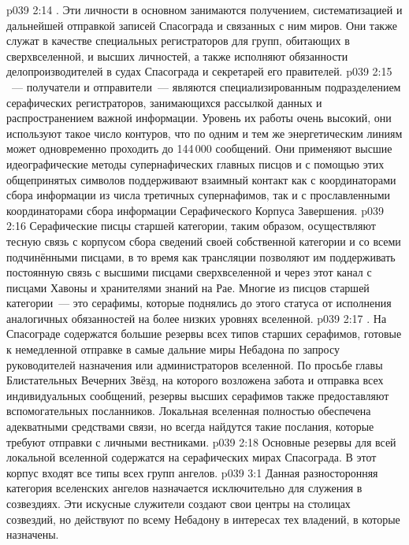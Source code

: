 \vs p039 2:14 . Эти личности в основном занимаются получением, систематизацией и дальнейшей отправкой записей Спасограда и связанных с ним миров. Они также служат в качестве специальных регистраторов для групп, обитающих в сверхвселенной, и высших личностей, а также исполняют обязанности делопроизводителей в судах Спасограда и секретарей его правителей.
\vs p039 2:15 \pc {}~--- получатели и отправители~--- являются специализированным подразделением серафических регистраторов, занимающихся рассылкой данных и распространением важной информации. Уровень их работы очень высокий, они используют такое число контуров, что по одним и тем же энергетическим линиям может одновременно проходить до 144\,000 сообщений. Они применяют высшие идеографические методы супернафических главных писцов и с помощью этих общепринятых символов поддерживают взаимный контакт как с координаторами сбора информации из числа третичных супернафимов, так и с прославленными координаторами сбора информации Серафического Корпуса Завершения.
\vs p039 2:16 Серафические писцы старшей категории, таким образом, осуществляют тесную связь с корпусом сбора сведений своей собственной категории и со всеми подчинёнными писцами, в то время как трансляции позволяют им поддерживать постоянную связь с высшими писцами сверхвселенной и через этот канал с писцами Хавоны и хранителями знаний на Рае. Многие из писцов старшей категории~--- это серафимы, которые поднялись до этого статуса от исполнения аналогичных обязанностей на более низких уровнях вселенной.
\vs p039 2:17 . На Спасограде содержатся большие резервы всех типов старших серафимов, готовые к немедленной отправке в самые дальние миры Небадона по запросу руководителей назначения или администраторов вселенной. По просьбе главы Блистательных Вечерних Звёзд, на которого возложена забота и отправка всех индивидуальных сообщений, резервы высших серафимов также предоставляют вспомогательных посланников. Локальная вселенная полностью обеспечена адекватными средствами связи, но всегда найдутся такие послания, которые требуют отправки с личными вестниками.
\vs p039 2:18 \pc Основные резервы для всей локальной вселенной содержатся на серафических мирах Спасограда. В этот корпус входят все типы всех групп ангелов.
\vs p039 3:1 Данная разносторонняя категория вселенских ангелов назначается исключительно для служения в созвездиях. Эти искусные служители создают свои центры на столицах созвездий, но действуют по всему Небадону в интересах тех владений, в которые назначены.
